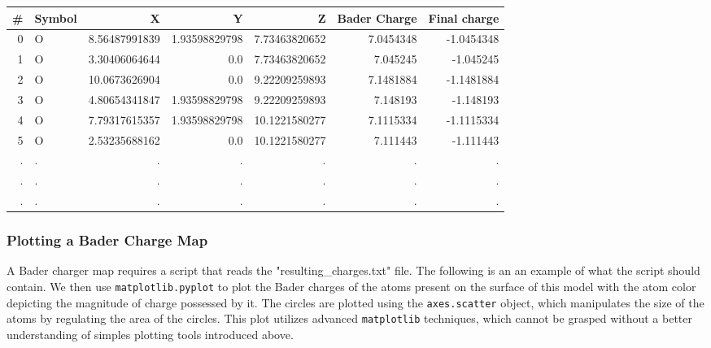 \documentclass[11pt]{article}
\begin{document}
\begin{center}
\begin{tabular}{rlrrrrr}
\# & Symbol & X & Y & Z & Bader Charge & Final charge\\
\hline
0 & O & 8.56487991839 & 1.93598829798 & 7.73463820652 & 7.0454348 & -1.0454348\\
1 & O & 3.30406064644 & 0.0 & 7.73463820652 & 7.045245 & -1.045245\\
2 & O & 10.0673626904 & 0.0 & 9.22209259893 & 7.1481884 & -1.1481884\\
3 & O & 4.80654341847 & 1.93598829798 & 9.22209259893 & 7.148193 & -1.148193\\
4 & O & 7.79317615357 & 1.93598829798 & 10.1221580277 & 7.1115334 & -1.1115334\\
5 & O & 2.53235688162 & 0.0 & 10.1221580277 & 7.111443 & -1.111443\\
. & . & . & . & . & . & .\\
. & . & . & . & . & . & .\\
. & . & . & . & . & . & .\\
\end{tabular}
\end{center}

\subsubsection{Plotting a Bader Charge Map}
\label{sec:org3a512ec}
A Bader charger map requires a script that reads the "resulting\_charges.txt" file. The following is an an example of what the script should contain. We then use \texttt{matplotlib.pyplot} to plot the Bader charges of the atoms present on the surface of this model with the atom color depicting the magnitude of charge possessed by it. The circles are plotted using the \texttt{axes.scatter} object, which manipulates the size of the atoms by regulating the area of the circles. This plot utilizes advanced \texttt{matplotlib} techniques, which cannot be grasped without a better understanding of simples plotting tools introduced above.
\end{document}

